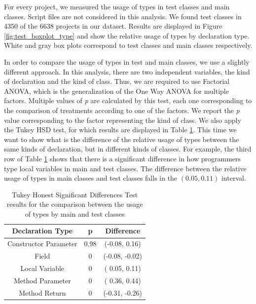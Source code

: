 \documentclass[msc]{ppgccufmg}
\begin{document}
For every project, we measured the usage of types in test classes and main classes.
Script files are not considered in this analysis.
We found test classes in 4350 of the 6638 projects in our dataset.
Results are displayed in Figure \ref{fig:test_boxplot_type} and show the relative usage of types by declaration type.
White and gray box plots correspond to test classes and main classes respectively.

In order to compare the usage of types in test and main classes, we use a slightly different approach.
In this analysis, there are two independent variables, the kind of declaration and the kind of class.
Thus, we are required to use Factorial ANOVA, which is the generalization of the One Way ANOVA for multiple factors.
Multiple values of \emph{p} are calculated by this test, each one corresponding to the comparison of treatments according to one of the factors.
We report the \emph{p} value corresponding to the factor representing the kind of class.
We also apply the Tukey HSD test, for which results are displayed in Table \ref{tab:test_utest_type}.
This time we want to show what is the difference of the relative usage of types between the same kinds of declaration, but in different kinds of classes.
For example, the third row of Table \ref{tab:test_utest_type} shows that there is a significant difference in how programmers type local variables in main and test classes.
The difference between the relative usage of types in main classes and test classes falls in the $(0.05, 0.11)$ interval.


\begin{table}[h!]
\centering{}%

\begin{tabular}{|c|c|c|}
\hline 
Declaration Type 		& p & Difference \\
\hline 
\hline 
Constructor Parameter &  0.98     & (-0.08,  0.16) \\ \hline
Field &  0          & (-0.08, -0.02)  \\ \hline
Local Variable &  0          & ( 0.05,  0.11) \\ \hline
Method Parameter &  0          & ( 0.36,  0.44) \\ \hline
Method Return &  0          & (-0.31, -0.26) \\ \hline
\end{tabular}
\caption{Tukey Honest Significant Differences Test results for the comparison between the usage of types by main and test classes}
\label{tab:test_utest_type}
\end{table}
\end{document}

